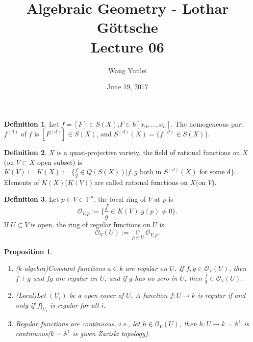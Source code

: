 \documentclass{amsart}
\theoremstyle{plain}
\newtheorem{proposition}{Proposition}
\theoremstyle{definition}
\newtheorem{definition}{Definition}
\theoremstyle{remark}
\numberwithin{equation}{section}
\begin{document}
\title[Complete-simple distributive lattices]
{Algebraic Geometry - Lothar G\"{o}ttsche \\
	Lecture 06}
\author{Wang Yunlei}
\date{June 19, 2017}
 
\maketitle

 
 \begin{definition}
 	Let $ f= [F]\in S(X) $,$ F\in k[x_0,\dots,x_n] $. The homogeneous part $ f^{(d)} $ of $ f $ is $ [F^{(d)}]\in S(X) $, and
 	$ S^{(d)}(X) = \{ f^{(d)}\in S(X) \} $.
 \end{definition}
 \begin{definition}
 	$ X $ is a quasi-projective variety, the field of rational functions on $ X $(on $ V \subset X$ open subset) is
 	$ K(V):=K(X):=\{ \frac{f}{g}\in Q(S(X))|f,g \text{ both in } S^{(d)}(X) \text{ for some d} \} $.
 	Elements of $ K(X) $($ K(V) $) are called rational functions on $ X $(on $ V $).
 \end{definition}
 \begin{definition}
 	Let $ p\in V\subset\mathbb{P}^n $, the local ring of $ V $ at $ p $ is
 	\begin{equation}
 	\mathcal{O}_{V,p}:=\{ \frac{f}{g}\in K(V)|g(p)\neq 0 \}.
 	\end{equation}
 	If $ U\subset V $ is open, the ring of regular functions on $ U $ is
 	\begin{equation}
 	\mathcal{O}_V(U):=\mathop{\cap}\limits_{p\in U}\mathcal{O}_{V,p}.
 	\end{equation}
 \end{definition}
 \begin{proposition}\label{8}
 	\begin{enumerate}
 		\item ($ k $-algebra)Constant functions $ a\in k $ are regular on $ U $. If $ f,g\in \mathcal{O}_V(U) $, then $ f+g $ and $ fg $ are regular on $ U $, and if $ g $ has no zero in $ U $, then $ \frac{f}{g} \in \mathcal{O}_{V}(U)$.
 		\item (Local)Let $ (U_i) $ be a open cover of $ U $. A function $ f:U\to k $ is regular if and only if $ f|_{U_i} $ is regular for all $ i $.
 		\item Regular functions are continuous. i.e., let $ h\in \mathcal{O}_V(U) $, then $ h:U\to k=\mathbb{A}^1 $ is continuous($ k=\mathbb{A}^1 $ is given Zariski topology).
 	\end{enumerate}
 \end{proposition}
\end{document}
